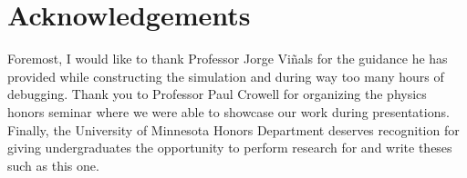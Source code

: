 \documentclass[preprint, aps]{revtex4-1}
\begin{document}
\section*{Acknowledgements}
Foremost, I would like to thank Professor Jorge Vi\~nals for the guidance he has
provided while constructing the simulation and during way too many hours of
debugging. Thank you to Professor Paul Crowell for organizing the physics honors
seminar where we were able to showcase our work during presentations. Finally,
the University of Minnesota Honors Department deserves recognition for giving 
undergraduates the opportunity to perform research for and write theses such as 
this one.


{}

\end{document}
